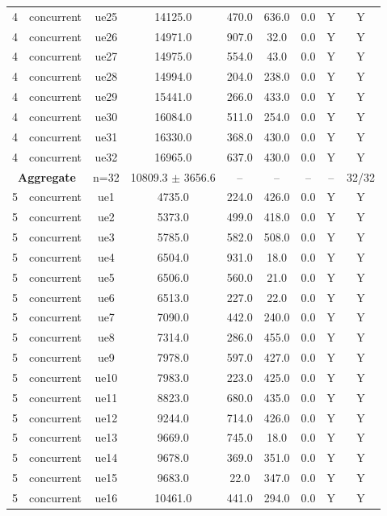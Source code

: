\begin{table}[ht]
\begin{tabular}{|c|c|c|c|c|c|c|c|c|}
4 & concurrent & ue25 & 14125.0 & 470.0 & 636.0 & 0.0 & Y & Y \\
4 & concurrent & ue26 & 14971.0 & 907.0 & 32.0 & 0.0 & Y & Y \\
4 & concurrent & ue27 & 14975.0 & 554.0 & 43.0 & 0.0 & Y & Y \\
4 & concurrent & ue28 & 14994.0 & 204.0 & 238.0 & 0.0 & Y & Y \\
4 & concurrent & ue29 & 15441.0 & 266.0 & 433.0 & 0.0 & Y & Y \\
4 & concurrent & ue30 & 16084.0 & 511.0 & 254.0 & 0.0 & Y & Y \\
4 & concurrent & ue31 & 16330.0 & 368.0 & 430.0 & 0.0 & Y & Y \\
4 & concurrent & ue32 & 16965.0 & 637.0 & 430.0 & 0.0 & Y & Y \\
\multicolumn{2}{|c|}{\textbf{Aggregate}} & n=32 & 10809.3 $\pm$ 3656.6 & -- & -- & -- & -- & 32/32 \\
\hline
5 & concurrent & ue1 & 4735.0 & 224.0 & 426.0 & 0.0 & Y & Y \\
5 & concurrent & ue2 & 5373.0 & 499.0 & 418.0 & 0.0 & Y & Y \\
5 & concurrent & ue3 & 5785.0 & 582.0 & 508.0 & 0.0 & Y & Y \\
5 & concurrent & ue4 & 6504.0 & 931.0 & 18.0 & 0.0 & Y & Y \\
5 & concurrent & ue5 & 6506.0 & 560.0 & 21.0 & 0.0 & Y & Y \\
5 & concurrent & ue6 & 6513.0 & 227.0 & 22.0 & 0.0 & Y & Y \\
5 & concurrent & ue7 & 7090.0 & 442.0 & 240.0 & 0.0 & Y & Y \\
5 & concurrent & ue8 & 7314.0 & 286.0 & 455.0 & 0.0 & Y & Y \\
5 & concurrent & ue9 & 7978.0 & 597.0 & 427.0 & 0.0 & Y & Y \\
5 & concurrent & ue10 & 7983.0 & 223.0 & 425.0 & 0.0 & Y & Y \\
5 & concurrent & ue11 & 8823.0 & 680.0 & 435.0 & 0.0 & Y & Y \\
5 & concurrent & ue12 & 9244.0 & 714.0 & 426.0 & 0.0 & Y & Y \\
5 & concurrent & ue13 & 9669.0 & 745.0 & 18.0 & 0.0 & Y & Y \\
5 & concurrent & ue14 & 9678.0 & 369.0 & 351.0 & 0.0 & Y & Y \\
5 & concurrent & ue15 & 9683.0 & 22.0 & 347.0 & 0.0 & Y & Y \\
5 & concurrent & ue16 & 10461.0 & 441.0 & 294.0 & 0.0 & Y & Y \\

\end{tabular}
\end{table}
